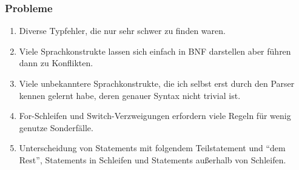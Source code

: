 \documentclass{beamer}
\begin{document}
  \begin{frame} %
    \frametitle{Probleme} %
    \begin{enumerate}
      \item Diverse Typfehler, die nur sehr schwer zu finden waren.
      \item Viele Sprachkonstrukte lassen sich einfach in BNF darstellen aber führen dann zu Konflikten.
      \item Viele unbekanntere Sprachkonstrukte, die ich selbst erst durch den Parser kennen gelernt habe, deren genauer Syntax nicht trivial ist.
      \item For-Schleifen und Switch-Verzweigungen erfordern viele Regeln für wenig genutze Sonderfälle.
      \item Unterscheidung von Statements mit folgendem Teilstatement und ``dem Rest'', Statements in Schleifen und Statements außerhalb von Schleifen.
    \end{enumerate}
  \end{frame}
  
  
  
  
\end{document}
